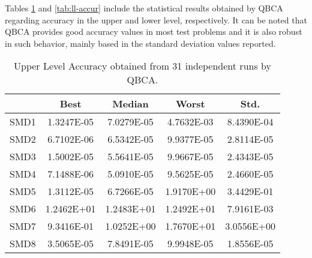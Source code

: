 \documentclass[conference]{IEEEtran}
\theoremstyle{definition}
\begin{document}
Tables \ref{tab:ul-accur} and \ref{tab:ll-accur} include the statistical results
obtained by QBCA regarding accuracy in the upper and lower level, respectively.
It can be noted that QBCA provides good accuracy values in most test problems
and it is also robust in such behavior, mainly based in the standard deviation
values reported. 

\begin{table}[htbp]
    \caption{Upper Level Accuracy obtained from 31 independent runs by QBCA.}
    \label{tab:ul-accur}
    \centering
    \begin{tabular}{ccccc}
        \hline
        & Best &  Median  &  Worst &  Std. \\ \hline
        SMD1 & 1.3247E-05 & 7.0279E-05 %
        & 4.7632E-03 & 8.4390E-04 \\ \hline 
        SMD2 & 6.7102E-06 & 6.5342E-05 %
        & 9.9377E-05 & 2.8114E-05 \\ \hline 
        SMD3 & 1.5002E-05 & 5.5641E-05 %
        & 9.9667E-05 & 2.4343E-05 \\ \hline 
        SMD4 & 7.1488E-06 & 5.0910E-05 %
        & 9.5625E-05 & 2.4660E-05 \\ \hline 
        SMD5 & 1.3112E-05 & 6.7266E-05 %
        & 1.9170E+00 & 3.4429E-01 \\ \hline 
        SMD6 & 1.2462E+01 & 1.2483E+01 %
        & 1.2492E+01 & 7.9161E-03 \\ \hline 
        SMD7 & 9.3416E-01 & 1.0252E+00 %
        & 1.7670E+01 & 3.0556E+00 \\ \hline 
        SMD8 & 3.5065E-05 & 7.8491E-05 %
        & 9.9948E-05 & 1.8556E-05 \\ \hline 
 
    \end{tabular}
\end{table}
% 
\end{document}
